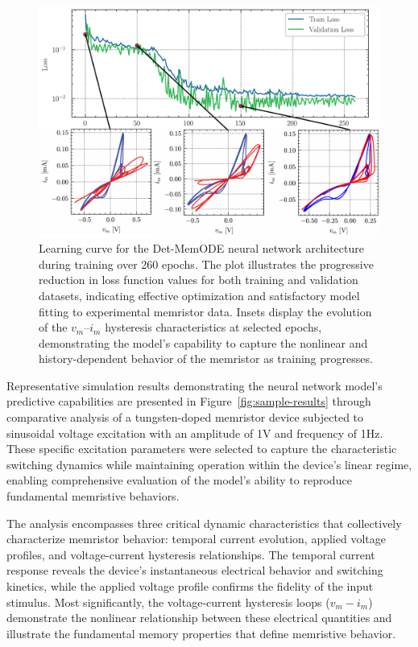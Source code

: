 \documentclass[lettersize,journal]{IEEEtran}
\begin{document}
\begin{figure}[!t]
  \centering
  \includegraphics[width=\linewidth]{figs/Training_process.pdf}
  \caption{Learning curve for the Det-MemODE neural network architecture during training over 260 epochs. The plot illustrates the progressive reduction in loss function values for both training and validation datasets, indicating effective optimization and satisfactory model fitting to experimental memristor data. Insets display the evolution of the \(v_m\)--\(i_m\) hysteresis characteristics at selected epochs, demonstrating the model's capability to capture the nonlinear and history-dependent behavior of the memristor as training progresses.}
  \label{fig:learning-curve}
\end{figure}



Representative simulation results demonstrating the neural network model's predictive capabilities are presented in Figure~\ref{fig:sample-results} through comparative analysis of a tungsten-doped memristor device subjected to sinusoidal voltage excitation with an amplitude of 1V and frequency of 1Hz. These specific excitation parameters were selected to capture the characteristic switching dynamics while maintaining operation within the device's linear regime, enabling comprehensive evaluation of the model's ability to reproduce fundamental memristive behaviors.

The analysis encompasses three critical dynamic characteristics that collectively characterize memristor behavior: temporal current evolution, applied voltage profiles, and voltage-current hysteresis relationships. The temporal current response reveals the device's instantaneous electrical behavior and switching kinetics, while the applied voltage profile confirms the fidelity of the input stimulus. Most significantly, the voltage-current hysteresis loops (\(v_m - i_m\)) demonstrate the nonlinear relationship between these electrical quantities and illustrate the fundamental memory properties that define memristive behavior.
\end{document}
